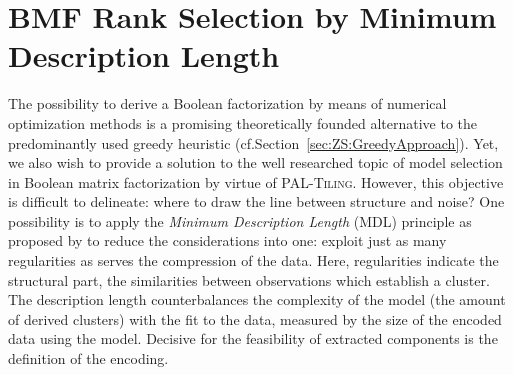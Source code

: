 \chapter{BMF Rank Selection by Minimum Description Length}
\label{chap:RankMDL}
The possibility to derive a Boolean factorization by means of  numerical optimization methods is a promising theoretically founded alternative to the predominantly used greedy heuristic (cf.\@ Section~\ref{sec:ZS:GreedyApproach}). Yet, we also wish to provide a solution to the well researched topic of model selection in Boolean matrix factorization by virtue of \textsc{PAL-Tiling}.  
However, this objective is difficult to delineate: where to draw the line between structure and noise? One possibility is to apply the \emph{Minimum Description Length} (MDL) principle as proposed by \cite{miettinen2014mdl4bmf} to reduce the considerations into one: exploit just as many regularities as serves the compression of the data. Here, regularities indicate the structural part, 
the similarities between observations which establish a cluster. The description length counterbalances the complexity of the model (the amount of derived clusters) with the fit to the data, measured by the size of the encoded data using the model. Decisive for the feasibility of extracted components is the definition of the encoding. 

